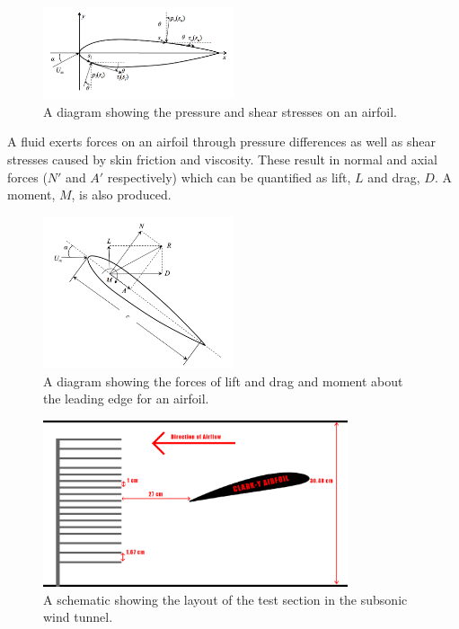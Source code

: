 \documentclass[11pt, letterpaper]{article}
\begin{document}
\begin{figure}[h]
        \centering
        \includegraphics[width=0.5\textwidth]{Images/airfoilpress.jpeg}
        \caption{A diagram showing the pressure and shear stresses on an airfoil.}
        \label{fig:setup_1}
\end{figure}

A fluid exerts forces on an airfoil through pressure differences as well as shear stresses caused by skin friction and viscosity. These result in normal and axial forces ($N'$ and $A'$ respectively) which can be quantified as lift, $L$ and drag, $D$. A moment, $M$, is also produced.

\begin{figure}[h]
        \centering
        \includegraphics[width=0.5\textwidth]{Images/airfoillandd.jpeg}
        \caption{A diagram showing the forces of lift and drag and moment about the leading edge for an airfoil.}
        \label{fig:setup_2}
\end{figure}

\begin{figure}[h]
        \centering        \includegraphics[width=0.8\textwidth]{Images/LAB2.png}
        \caption{A schematic showing the layout of the test section in the subsonic wind tunnel.}
        \label{fig:setup_3}
\end{figure}
\end{document}
